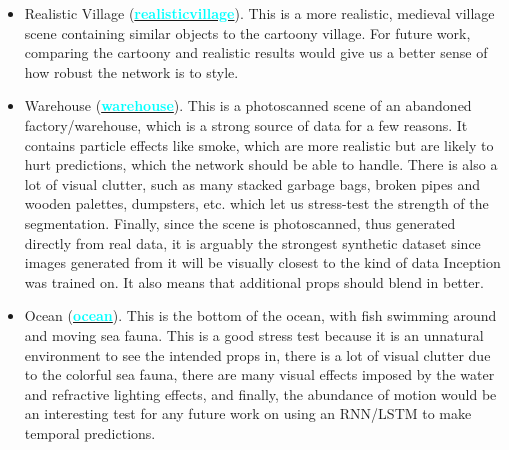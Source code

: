 \begin{itemize}[noitemsep,leftmargin=*]
    \item Realistic Village (\textbf{\href{https://www.unrealengine.com/marketplace/en-US/product/fantasy-and-medieval-artchitecture-kit}{\textcolor{cyan}{realisticvillage}}}). This is a more realistic, medieval village scene containing similar objects to the cartoony village. For future work, comparing the cartoony and realistic results would give us a better sense of how robust the network is to style.
    \item Warehouse (\textbf{\href{https://www.unrealengine.com/marketplace/en-US/product/megascans-abandoned-factory}{\textcolor{cyan}{warehouse}}}). This is a photoscanned scene of an abandoned factory/warehouse, which is a strong source of data for a few reasons. It contains particle effects like smoke, which are more realistic but are likely to hurt predictions, which the network should be able to handle. There is also a lot of visual clutter, such as many stacked garbage bags, broken pipes and wooden palettes, dumpsters, etc. which let us stress-test the strength of the segmentation. Finally, since the scene is photoscanned, thus generated directly from real data, it is arguably the strongest synthetic dataset since images generated from it will be visually closest to the kind of data Inception was trained on. It also means that additional props should blend in better. 
    \item Ocean (\textbf{\href{https://www.unrealengine.com/marketplace/en-US/product/ocean-floor-environment}{\textcolor{cyan}{ocean}}}). This is the bottom of the ocean, with fish swimming around and moving sea fauna. This is a good stress test because it is an unnatural environment to see the intended props in, there is a lot of visual clutter due to the colorful sea fauna, there are many visual effects imposed by the water and refractive lighting effects, and finally, the abundance of motion would be an interesting test for any future work on using an RNN/LSTM to make temporal predictions.
\end{itemize}

